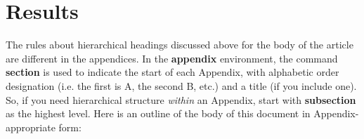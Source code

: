 \documentclass{sig-alternate}
\begin{document}

%
%

\appendix
\section{Results}
The rules about hierarchical headings discussed above for
the body of the article are different in the appendices.
In the \textbf{appendix} environment, the command
\textbf{section} is used to
indicate the start of each Appendix, with alphabetic order
designation (i.e. the first is A, the second B, etc.) and
a title (if you include one).  So, if you need
hierarchical structure
\textit{within} an Appendix, start with \textbf{subsection} as the
highest level. Here is an outline of the body of this
document in Appendix-appropriate form:
\end{document}
